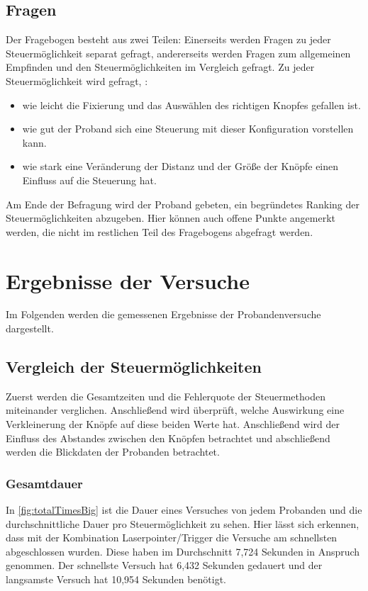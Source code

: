 \subsection{Fragen}
Der Fragebogen besteht aus zwei Teilen: Einerseits werden Fragen zu jeder Steuermöglichkeit separat gefragt, andererseits werden Fragen zum allgemeinen Empfinden und den Steuermöglichkeiten im Vergleich gefragt.
Zu jeder Steuermöglichkeit wird gefragt, :
\begin{itemize}
	\item wie leicht die Fixierung und das Auswählen des richtigen Knopfes gefallen ist.
	\item wie gut der Proband sich eine Steuerung mit dieser Konfiguration vorstellen kann.
	\item wie stark eine Veränderung der Distanz und der Größe der Knöpfe einen Einfluss auf die Steuerung hat.
\end{itemize}
Am Ende der Befragung wird der Proband gebeten, ein begründetes Ranking der Steuermöglichkeiten abzugeben. Hier können auch offene Punkte angemerkt werden, die nicht im restlichen Teil des Fragebogens abgefragt werden.


\section{Ergebnisse der Versuche}
\label{section:results}
Im Folgenden werden die gemessenen Ergebnisse der Probandenversuche dargestellt. 
\subsection{Vergleich der Steuermöglichkeiten}
\label{section:comparison}
Zuerst werden die Gesamtzeiten und die Fehlerquote der Steuermethoden miteinander verglichen. Anschließend wird überprüft, welche Auswirkung eine Verkleinerung der Knöpfe auf diese beiden Werte hat. Anschließend wird der Einfluss des Abstandes zwischen den Knöpfen betrachtet und abschließend werden die Blickdaten der Probanden betrachtet.
\subsubsection{Gesamtdauer}
In \autoref{fig:totalTimesBig} ist die Dauer eines Versuches von jedem Probanden und die durchschnittliche Dauer pro Steuermöglichkeit zu sehen. Hier lässt sich erkennen, dass mit der Kombination Laserpointer/Trigger die Versuche am schnellsten abgeschlossen wurden. Diese haben im Durchschnitt 7,724 Sekunden in Anspruch genommen. Der schnellste Versuch hat 6,432 Sekunden gedauert und der langsamste Versuch hat 10,954 Sekunden benötigt.

